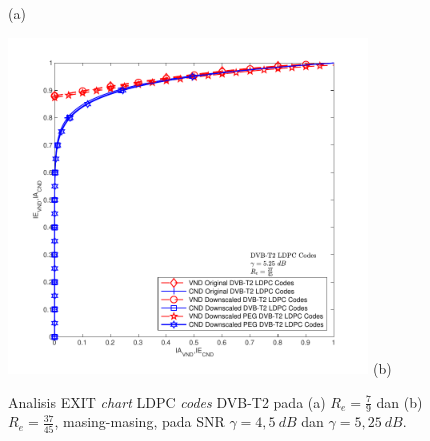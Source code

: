 \begin{figure}[H]
\begin{minipage}{1\linewidth}
		\center  (a)
	\end{minipage}
	\hfill
	\begin{minipage}{1\linewidth}
		\hspace{0.75 cm}
		\includegraphics[width=0.85\textwidth]{pics/exit/56/56semua=snr5,25Ich=0,8804.pdf}
		\vspace{-1cm}
		\center (b)
	\end{minipage}
	\caption {Analisis EXIT \textit{chart} LDPC \textit{codes} DVB-T2 pada (a) $R_e=\frac{7}{9}$ dan (b) $R_e=\frac{37}{45}$, masing-masing, pada SNR $\gamma=4,5~dB$ dan $\gamma=5,25~dB$.}
	\label{gambar: exit737}
\end{figure}







